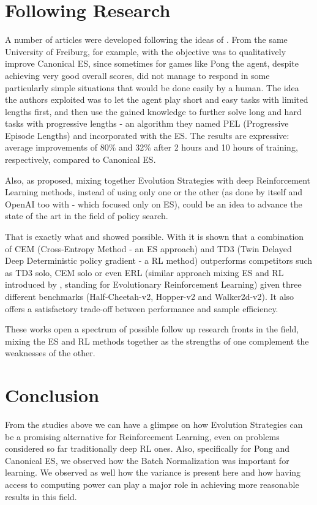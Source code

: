 \documentclass[10pt]{article} %
\begin{document}
\section{Following Research}
A number of articles were developed following the ideas of \cite{back-to-basics}. From the same University of Freiburg, for example, with \cite{pel} the objective was to qualitatively improve Canonical ES, since sometimes for games like Pong the agent, despite achieving very good overall scores, did not manage to respond in some particularly simple situations that would be done easily by a human. The idea the authors exploited was to let the agent play short and easy tasks with limited lengths first, and then use the gained knowledge to further solve long and hard tasks with progressive lengths - an algorithm they named PEL (Progressive
Episode Lengths) and incorporated with the ES. The results are expressive: average improvements of 80\% and 32\% after 2 hours and 10 hours of training, respectively, compared to Canonical ES.

Also, as \cite{back-to-basics} proposed, mixing together Evolution Strategies with deep Reinforcement Learning methods, instead of using only one or the other (as done by \cite{back-to-basics} itself and OpenAI too with \cite{salimans2017evolution} -  which focused only on ES), could be an idea to advance the state of the art in the field of policy search. 

That is exactly what \cite{cem-rl} and \cite{erl} showed possible. With \cite{cem-rl} it is shown that a combination of CEM (Cross-Entropy Method - an ES approach) and TD3 (Twin Delayed Deep Deterministic policy gradient - a RL method) outperforms competitors such as TD3 solo, CEM solo or even ERL (similar approach mixing ES and RL introduced by \cite{erl}, standing for Evolutionary
Reinforcement Learning) given three different benchmarks (Half-Cheetah-v2, Hopper-v2 and Walker2d-v2). It also offers a satisfactory trade-off between performance and sample efficiency. 

These works open a spectrum of possible follow up research fronts in the field, mixing the ES and RL methods together as the strengths of one complement the weaknesses of the other. 

\section{Conclusion}

From the studies above we can have a glimpse on how Evolution Strategies can be a promising alternative for Reinforcement Learning, even on problems considered so far traditionally deep RL ones. Also, specifically for Pong and Canonical ES, we observed how the Batch Normalization was important for learning. We observed as well how the variance is present here and how having access to computing power can play a major role in achieving more reasonable results in this field. 
\end{document}
